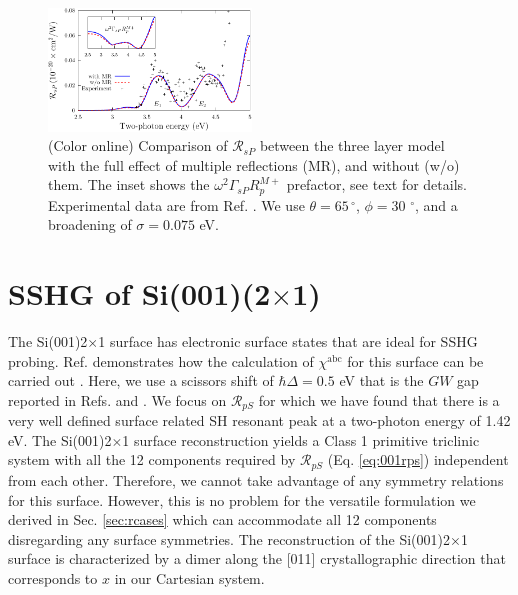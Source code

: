 \documentclass[aps,prb,10pt,showpacs,letterpaper,twocolumn]{revtex4-1}
\begin{document}
\begin{figure}[t]
\includegraphics[width=0.48\textwidth]{fig5}
\caption{(Color online) Comparison of ${\mathcal R}_{sP}$ between the three
layer model with the full effect of multiple reflections (MR), and without (w/o)
them. The inset shows the $\omega^2\Gamma_{sP} R^{M+}_{p}$ prefactor, see text
for details. Experimental data are from Ref. . We use
$\theta = 65\,^{\circ}$, $\phi = 30\,\,^{\circ}$, and a broadening of $\sigma =
0.075$ eV.}
\label{fig:rsp}
\end{figure}

\section{SSHG of 
\texorpdfstring{S\lowercase{i}(001)(2$\times$1)}{Si(001)(2x1)}}
\label{sec:Si2x1}

The Si(001)2$\times$1 surface has electronic surface states that are ideal for
SSHG probing. Ref.  demonstrates how the calculation
of $\chi^{\mathrm{abc}}$ for this surface can be carried out . Here, we use a
scissors shift of $\hbar\Delta= 0.5$ eV that is the $GW$ gap reported in Refs.
 and . We focus on
$\mathcal{R}_{pS}$ for which we have found that there is a very well defined
surface related SH resonant peak at a two-photon energy of 1.42 eV. The
Si(001)2$\times$1 surface reconstruction yields a Class 1 primitive triclinic
system with all the 12 components required by $\mathcal{R}_{pS}$ (Eq.
\eqref{eq:001rps}) independent from each other.\cite{popovbook} Therefore, we
cannot take advantage of any symmetry relations for this surface. However, this
is no problem for the versatile formulation we derived in Sec. \ref{sec:rcases}
which can accommodate all 12 components disregarding any surface symmetries. The
reconstruction of the Si(001)2$\times$1 surface is characterized by a dimer
along the [011] crystallographic direction that corresponds to $x$ in our
Cartesian system.\cite{andersonPRB15}
\end{document}

